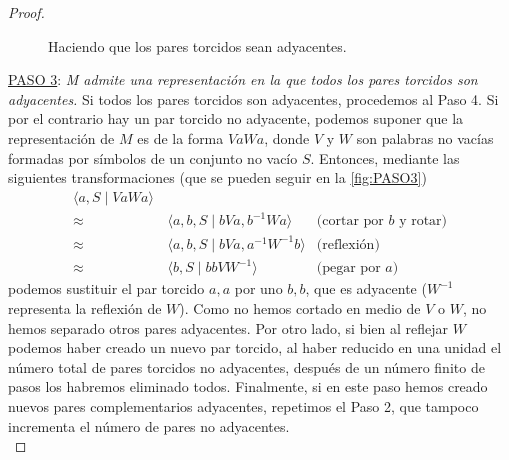 \documentclass[10pt]{report}
\theoremstyle{definition}
\begin{document}
\begin{proof}
\begin{figure}
\caption{Haciendo que los pares torcidos sean adyacentes.\label{fig:PASO3}}
\end{figure}

\underline{PASO 3}: \textit{M admite una representación en la que todos los pares torcidos son adyacentes.} Si todos los pares torcidos son adyacentes, procedemos al Paso 4. Si por el contrario hay un par torcido no adyacente, podemos suponer que la representación de $M$ es de la forma $VaWa$, donde $V$ y $W$ son palabras no vacías formadas por símbolos de un conjunto no vacío $S$. Entonces, mediante las siguientes transformaciones (que se pueden seguir en la \autoref{fig:PASO3})
\begin{align*}
\langle a,S \mid VaWa \rangle  &&\\
\approx &\, \langle a,b,S \mid bVa, b^{-1}Wa \rangle &\text{(cortar por } b\text{ y rotar)}\\
\approx &\, \langle a,b,S \mid bVa, a^{-1}W^{-1}b \rangle & \text{(reflexión)} \\
\approx &\, \langle b,S \mid bbVW^{-1}\rangle & \text{(pegar por } a\text{)}
\end{align*}
podemos sustituir el par torcido $a,a$ por uno $b,b$, que es adyacente ($W^{-1}$ representa la reflexión de $W$). Como no hemos cortado en medio de $V$ o $W$, no hemos separado otros pares adyacentes. Por otro lado, si bien al reflejar $W$ podemos haber creado un nuevo par torcido, al haber reducido en una unidad el número total de pares torcidos no adyacentes, después de un número finito de pasos los habremos eliminado todos. Finalmente, si en este paso hemos creado nuevos pares complementarios adyacentes, repetimos el Paso 2, que tampoco incrementa el número de pares no adyacentes.\\



\end{proof}
\end{document}

